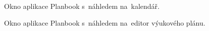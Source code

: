 \documentclass[male,czech,api_bc]{kitheses}
\begin{document}
\begin{figure}[H]
	\centering
	\caption{Okno aplikace Planbook s~náhledem na~kalendář.}
	\label{fig:planbook-1}
\end{figure}

\begin{figure}[H]
	\centering
	\caption{Okno aplikace Planbook s~náhledem na~editor výukového plánu.}
	\label{fig:planbook-2}
\end{figure}
\end{document}
